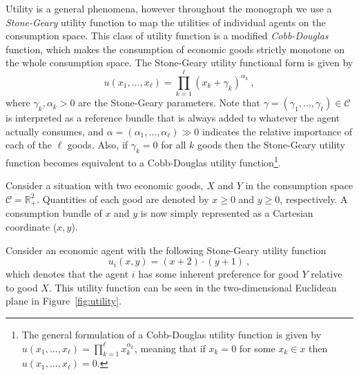 Utility is a general phenomena, however throughout the monograph we use a \emph{Stone-Geary} utility function to map the utilities of individual agents on the consumption space. This class of utility function is a modified \emph{Cobb-Douglas} function, which makes the consumption of economic goods strictly monotone on the whole consumption space. The Stone-Geary utility functional form is given by
\begin{equation}
u\left( x_{1}, \ldots, x_{\ell} \right) = \prod^{\ell}_{k = 1} \left( x_{k} + \gamma_{k} \right)^{\alpha_{k}} ~ ,
\end{equation}
where $\gamma_{k}, \alpha_{k} > 0$ are the Stone-Geary parameters. Note that $\gamma = \left( \gamma_{1}, \ldots, \gamma_{\ell} \right) \in \mathcal{C}$ is interpreted as a reference bundle that is always added to whatever the agent actually consumes, and $\alpha = \left( \alpha_{1}, \ldots, \alpha_{\ell} \right) \gg 0$ indicates the relative importance of each of the $\ell$ goods. Also, if $\gamma_{k} = 0$ for all $k$ goods then the Stone-Geary utility function becomes equivalent to a Cobb-Douglas utility function\footnote{The general formulation of a Cobb-Douglas utility function is given by $u\left( x_{1}, \ldots, x_{\ell} \right) = \prod^{\ell}_{k = 1} x_{k}^{\alpha_{k}}$, meaning that if $x_{k} = 0$ for some $x_{k} \in x$ then $u\left( x_{1}, \ldots, x_{\ell} \right) = 0$.}.
\begin{example} \label{ex:utility}
Consider a situation with two economic goods, $X$ and $Y$ in the consumption space $\mathcal{C} = \mathbb{R}_{+}^{2}$. Quantities of each good are denoted by $x \geqslant 0$ and $y \geqslant 0$, respectively. A consumption bundle of $x$ and $y$ is now simply represented as a Cartesian coordinate ($x, y$).

Consider an economic agent with the following Stone-Geary utility function
\begin{equation}
u_{i}(x,y) = (x + 2) \cdot (y + 1) ~ ,
\end{equation}
which denotes that the agent $i$ has some inherent preference for good $Y$ relative to good $X$. This utility function can be seen in the two-dimensional Euclidean plane in Figure~\ref{fig:utility}.
\end{example}
